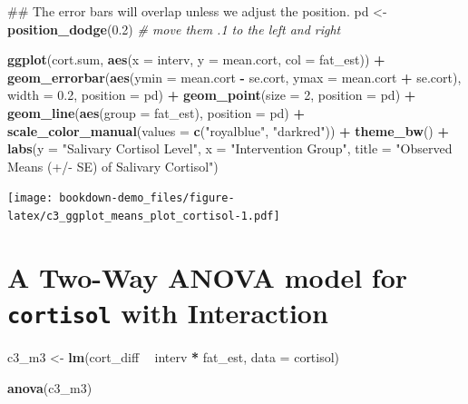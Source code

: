 \documentclass[]{book}
\newenvironment{Shaded}{\begin{snugshade}}{\end{snugshade}}
\newcommand{\KeywordTok}[1]{\textcolor[rgb]{0.13,0.29,0.53}{\textbf{#1}}}
\newcommand{\DataTypeTok}[1]{\textcolor[rgb]{0.13,0.29,0.53}{#1}}
\newcommand{\DecValTok}[1]{\textcolor[rgb]{0.00,0.00,0.81}{#1}}
\newcommand{\FloatTok}[1]{\textcolor[rgb]{0.00,0.00,0.81}{#1}}
\newcommand{\StringTok}[1]{\textcolor[rgb]{0.31,0.60,0.02}{#1}}
\newcommand{\CommentTok}[1]{\textcolor[rgb]{0.56,0.35,0.01}{\textit{#1}}}
\newcommand{\OperatorTok}[1]{\textcolor[rgb]{0.81,0.36,0.00}{\textbf{#1}}}
\newcommand{\NormalTok}[1]{#1}
\theoremstyle{definition}
\theoremstyle{definition}
\theoremstyle{definition}
\theoremstyle{remark}
\begin{document}
\begin{Shaded}
\begin{Highlighting}[]
\NormalTok{## The error bars will overlap unless we adjust the position.}
\NormalTok{pd <-}\StringTok{ }\KeywordTok{position_dodge}\NormalTok{(}\FloatTok{0.2}\NormalTok{) }\CommentTok{# move them .1 to the left and right}

\KeywordTok{ggplot}\NormalTok{(cort.sum, }\KeywordTok{aes}\NormalTok{(}\DataTypeTok{x =}\NormalTok{ interv, }\DataTypeTok{y =}\NormalTok{ mean.cort, }\DataTypeTok{col =}\NormalTok{ fat_est)) }\OperatorTok{+}
\StringTok{    }\KeywordTok{geom_errorbar}\NormalTok{(}\KeywordTok{aes}\NormalTok{(}\DataTypeTok{ymin =}\NormalTok{ mean.cort }\OperatorTok{-}\StringTok{ }\NormalTok{se.cort, }
                      \DataTypeTok{ymax =}\NormalTok{ mean.cort }\OperatorTok{+}\StringTok{ }\NormalTok{se.cort),}
                  \DataTypeTok{width =} \FloatTok{0.2}\NormalTok{, }\DataTypeTok{position =}\NormalTok{ pd) }\OperatorTok{+}
\StringTok{    }\KeywordTok{geom_point}\NormalTok{(}\DataTypeTok{size =} \DecValTok{2}\NormalTok{, }\DataTypeTok{position =}\NormalTok{ pd) }\OperatorTok{+}\StringTok{ }
\StringTok{    }\KeywordTok{geom_line}\NormalTok{(}\KeywordTok{aes}\NormalTok{(}\DataTypeTok{group =}\NormalTok{ fat_est), }\DataTypeTok{position =}\NormalTok{ pd) }\OperatorTok{+}
\StringTok{    }\KeywordTok{scale_color_manual}\NormalTok{(}\DataTypeTok{values =} \KeywordTok{c}\NormalTok{(}\StringTok{"royalblue"}\NormalTok{, }\StringTok{"darkred"}\NormalTok{)) }\OperatorTok{+}
\StringTok{    }\KeywordTok{theme_bw}\NormalTok{() }\OperatorTok{+}
\StringTok{    }\KeywordTok{labs}\NormalTok{(}\DataTypeTok{y =} \StringTok{"Salivary Cortisol Level"}\NormalTok{, }\DataTypeTok{x =} \StringTok{"Intervention Group"}\NormalTok{,}
         \DataTypeTok{title =} \StringTok{"Observed Means (+/- SE) of Salivary Cortisol"}\NormalTok{)}
\end{Highlighting}
\end{Shaded}

\texttt{[image: bookdown-demo\_files/figure-latex/c3\_ggplot\_means\_plot\_cortisol-1.pdf]}

\section{\texorpdfstring{A Two-Way ANOVA model for \texttt{cortisol}
with
Interaction}{A Two-Way ANOVA model for cortisol with Interaction}}\label{a-two-way-anova-model-for-cortisol-with-interaction}

\begin{Shaded}
\begin{Highlighting}[]
\NormalTok{c3_m3 <-}\StringTok{ }\KeywordTok{lm}\NormalTok{(cort_diff }\OperatorTok{~}\StringTok{ }\NormalTok{interv }\OperatorTok{*}\StringTok{ }\NormalTok{fat_est, }\DataTypeTok{data =}\NormalTok{ cortisol)}

\KeywordTok{anova}\NormalTok{(c3_m3)}
\end{Highlighting}
\end{Shaded}
\end{document}
